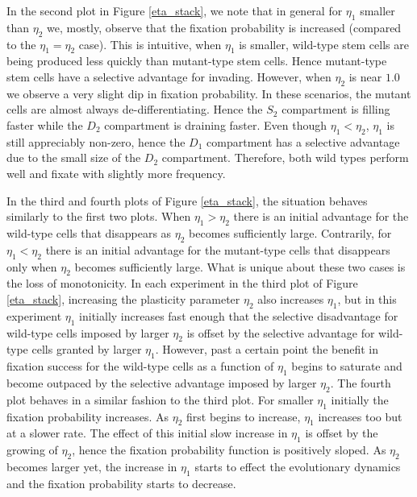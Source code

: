 \documentclass[12pt]{article}
\begin{document}
In the second plot in Figure \ref{eta_stack}, we note that in general for $\eta_1$ smaller than $\eta_2$ we, mostly, observe that the fixation probability is increased (compared to the $\eta_1=\eta_2$ case). This is intuitive, when $\eta_1$ is smaller, wild-type stem cells are being produced less quickly than mutant-type stem cells. Hence mutant-type stem cells have a selective advantage for invading. However, when $\eta_2$ is near $1.0$ we observe a very slight dip in fixation probability. In these scenarios, the mutant cells are almost always de-differentiating. Hence the $S_2$ compartment is filling faster while the $D_2$ compartment is draining faster. Even though $\eta_1<\eta_2$, $\eta_1$ is still appreciably non-zero, hence the $D_1$ compartment has a selective advantage due to the small size of the $D_2$ compartment. Therefore, both wild types perform well and fixate with slightly more frequency.

In the third and fourth plots of Figure \ref{eta_stack}, the situation behaves similarly to the first two plots. When $\eta_1>\eta_2$ there is an initial advantage for the wild-type cells that disappears as $\eta_2$ becomes sufficiently large. Contrarily, for $\eta_1<\eta_2$ there is an initial advantage for the mutant-type cells that disappears only when $\eta_2$ becomes sufficiently large. What is unique about these two cases is the loss of monotonicity. In each experiment in the third plot of Figure \ref{eta_stack}, increasing the plasticity parameter $\eta_2$ also increases $\eta_1$, but in this experiment $\eta_1$ initially increases fast enough that the selective disadvantage for wild-type cells imposed by larger $\eta_2$ is offset by the selective advantage for wild-type cells granted by larger $\eta_1$. However, past a certain point the benefit in fixation success for the wild-type cells as a function of $\eta_1$ begins to saturate and become outpaced by the selective advantage imposed by larger $\eta_2$. The fourth plot behaves in a similar fashion to the third plot. For smaller $\eta_1$ initially the fixation probability increases. As $\eta_2$ first begins to increase, $\eta_1$ increases too but at a slower rate. The effect of this initial slow increase in $\eta_1$ is offset by the growing of $\eta_2$, hence the fixation probability function is positively sloped. As $\eta_2$ becomes larger yet, the increase in $\eta_1$ starts to effect the evolutionary dynamics and the fixation probability starts to decrease.
\end{document}
